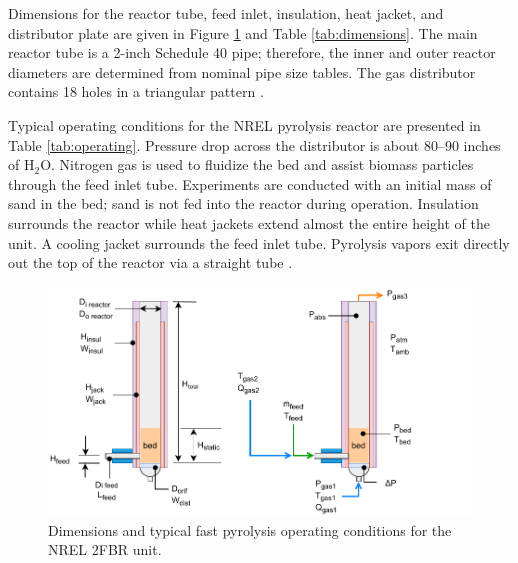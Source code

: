 Dimensions for the reactor tube, feed inlet, insulation, heat jacket, and distributor plate are given in Figure \ref{fig:pyrolyzer2} and Table \ref{tab:dimensions}. The main reactor tube is a 2-inch Schedule 40 pipe; therefore, the inner and outer reactor diameters are determined from nominal pipe size tables. The gas distributor contains 18 holes in a triangular pattern \cite{French-2019}.

Typical operating conditions for the NREL pyrolysis reactor are presented in Table \ref{tab:operating}. Pressure drop across the distributor is about 80--90 inches of H$_2$O. Nitrogen gas is used to fluidize the bed and assist biomass particles through the feed inlet tube. Experiments are conducted with an initial mass of sand in the bed; sand is not fed into the reactor during operation. Insulation surrounds the reactor while heat jackets extend almost the entire height of the unit. A cooling jacket surrounds the feed inlet tube. Pyrolysis vapors exit directly out the top of the reactor via a straight tube \cite{French-2019}.

\begin{figure}[H]
    \centering
    \includegraphics[width=\textwidth]{figures/pyrolyzer2.pdf}
    \caption{Dimensions and typical fast pyrolysis operating conditions for the NREL 2FBR unit.}
    \label{fig:pyrolyzer2}
\end{figure}

